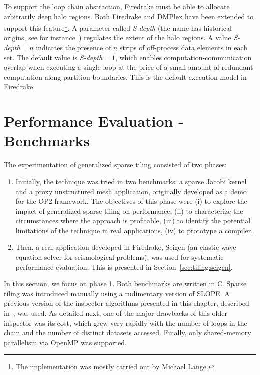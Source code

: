 To support the loop chain abstraction, Firedrake must be able to allocate arbitrarily deep halo regions. Both Firedrake and DMPlex have been extended to support this feature\footnote{The implementation was mostly carried out by Michael Lange.}. A parameter called {\em S-depth} (the name has historical origins, see for instance~\cite{s-depth-paper}) regulates the extent of the halo regions. A value {\em S-depth}$=n$ indicates the presence of $n$ strips of off-process data elements in each set. The default value is {\em S-depth}$=1$, which enables computation-communication overlap when executing a single loop at the price of a small amount of redundant computation along partition boundaries. This is the default execution model in Firedrake.


\section{Performance Evaluation - Benchmarks}
\label{sec:tiling:benchmarks}
The experimentation of generalized sparse tiling consisted of two phases:

\begin{enumerate}
\item Initially, the technique was tried in two benchmarks: a sparse Jacobi kernel and a proxy unstructured mesh application, originally developed as a demo for the OP2 framework. The objectives of this phase were (i) to explore the impact of generalized sparse tiling on performance, (ii) to characterize the circumstances where the approach is profitable, (iii) to identify the potential limitations of the technique in real applications, (iv) to prototype a compiler. 
\item Then, a real application developed in Firedrake, Seigen (an elastic wave equation solver for seismological problems), was used for systematic performance evaluation. This is presented in Section~\ref{sec:tiling:seigen}.
\end{enumerate}

In this section, we focus on phase 1. Both benchmarks are written in C. Sparse tiling was introduced manually using a rudimentary version of SLOPE. A previous version of the inspector algorithms presented in this chapter, described in~\cite{st-paper}, was used. As detailed next, one of the major drawbacks of this older inspector was its cost, which grew very rapidly with the number of loops in the chain and the number of distinct datasets accessed. Finally, only shared-memory parallelism via OpenMP was supported. 

